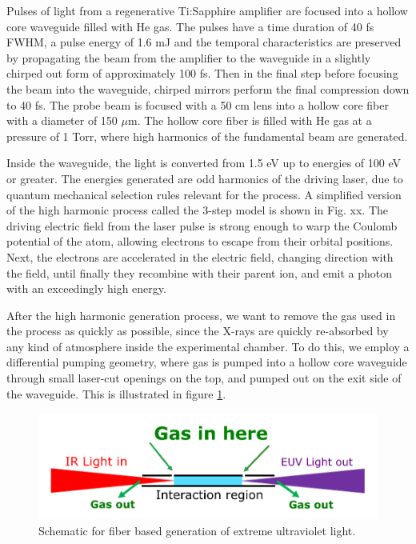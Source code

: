 Pulses of light from a regenerative Ti:Sapphire amplifier are focused into a hollow core waveguide filled with He gas. The pulses have a time duration of 40 fs FWHM, a pulse energy of 1.6 mJ and the temporal characteristics are preserved by propagating the beam from the amplifier to the waveguide in a slightly chirped out form of approximately 100 fs. Then in the final step before focusing the beam into the waveguide, chirped mirrors perform the final compression down to 40 fs. The probe beam is focused with a 50 cm lens into a hollow core fiber with a diameter of 150 $\mu$m. The hollow core fiber is filled with He gas at a pressure of 1 Torr, where high harmonics of the fundamental beam are generated. 

Inside the waveguide, the light is converted from 1.5 eV up to energies of 100 eV or greater. The energies generated are odd harmonics of the driving laser, due to quantum mechanical selection rules relevant for the process. A simplified version of the high harmonic process called the 3-step model is shown in Fig. xx. The driving electric field from the laser pulse is strong enough to warp the Coulomb potential of the atom, allowing electrons to escape from their orbital positions. Next, the electrons are accelerated in the electric field, changing direction with the field, until finally they recombine with their parent ion, and emit a photon with an exceedingly high energy. 

After the high harmonic generation process, we want to remove the gas used in the process as quickly as possible, since the X-rays are quickly re-absorbed by any kind of atmosphere inside the experimental chamber. To do this, we employ a differential pumping geometry, where gas is pumped into a hollow core waveguide through small laser-cut openings on the top, and pumped out on the exit side of the waveguide. This is illustrated in figure \ref{fig:Waveguide}.

\begin{figure}
	\begin{center}
		\includegraphics[width=150mm]{figs/FiberSchematic.pdf}
	\end{center}
	\caption{Schematic for fiber based generation of extreme ultraviolet light.}
	\label{fig:Waveguide}
\end{figure}

